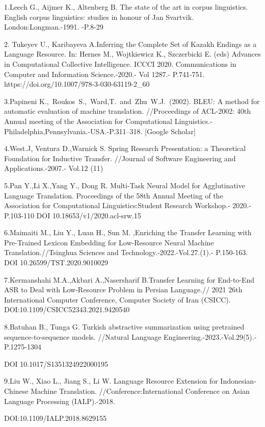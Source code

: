 \begin{noparindent}
1.Leech G., Aijmer K., Altenberg B. The state of the art in corpus
linguistics. English corpus linguistics: studies in honour of Jan
Svartvik. London:Longman.-1991. -P.8-29

2. Tukeyev U., Karibayeva A.Inferring the Complete Set of Kazakh Endings
as a Language Resource. In: Hernes M., Wojtkiewicz K., Szczerbicki E.
(eds) Advances in Computational Collective Intelligence. ICCCI 2020.
Communications in Computer and Information Science.-2020.- Vol 1287.-
P.741-751. https://doi.org/10.1007/978-3-030-63119-2\_60

3.Papineni K.,~Roukos~S.,~Ward,T.~and~Zhu~W.J.~(2002). BLEU: A method
for automatic evaluation of machine translation. //Proceedings of
ACL-2002: 40th Annual meeting of the Association for Computational
Linguistics.-Philadelphia,Pennsylvania.-USA.-P.311--318. {[}Google
Scholar{]}

4.West.J, Ventura D.,Warnick S. Spring Research Presentation: a
Theoretical Foundation for Inductive Transfer. //Journal of Software
Engineering and Applications.-2007.- Vol.12 (11)

5.Pan Y.,Li X.,Yang Y., Dong R. Multi-Task Neural Model for
Agglutinative Language Translation. Proceedings of the 58th Annual
Meeting of the Association for Computational Linguistics:Student
Research Workshop.- 2020.- P.103-110 DOI 10.18653/v1/2020.acl-srw.15

6.Maimaiti M., Liu Y., Luan H., Sun M. ,Enriching the Transfer Learning
with Pre-Trained Lexicon Embedding for Low-Resource Neural Machine
Translation.//Tsinghua Sciences and Technology.-2022.-Vol.27.(1).-
P.150-163. DOI 10.26599/TST.2020.9010029

7.Kermanshahi M.A.,Akbari A.,Nasersharif B.Transfer Learning for
End-to-End ASR to Deal with Low-Resource Problem in Persian Language.//
2021 26th International Computer Conference, Computer Society of Iran
(CSICC). DOI:10.1109/CSICC52343.2021.9420540

8.Batuhan B., Tunga G. Turkish abstractive summarization using
pretrained sequence-to-sequence models. //Natural Language
Engineering.-2023.-Vol.29(5).- P.1275-1304

DOI 10.1017/S1351324922000195

9.Liu W., Xiao L., Jiang S., Li W. Language Resource Extension for
Indonesian-Chinese Machine Translation. //Conference:International
Conference on Asian Language Processing (IALP).-2018.

DOI:10.1109/IALP.2018.8629155


\end{noparindent}
